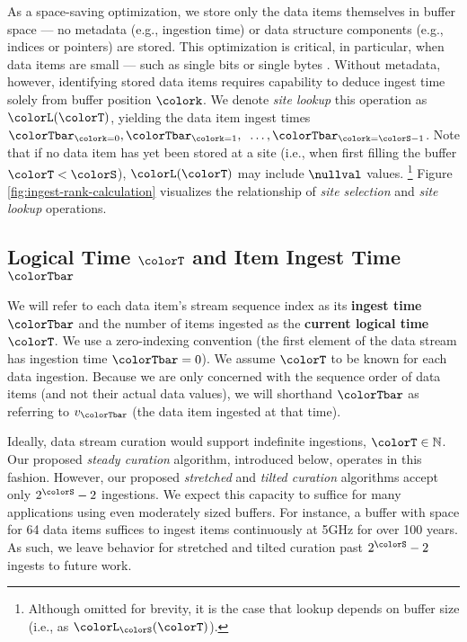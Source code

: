 As a space-saving optimization, we store only the data items themselves in buffer space --- no metadata (e.g., ingestion time) or data structure components (e.g., indices or pointers) are stored.
This optimization is critical, in particular, when data items are small --- such as single bits or single bytes \citep{moreno2022hereditary}.
Without metadata, however, identifying stored data items requires capability to deduce ingest time solely from buffer position $\colork$.
We denote \textit{site lookup} this operation as $\colorL(\colorT)$, yielding the data item ingest times $\colorTbar_{\colork=0}, \colorTbar_{\colork=1}, \;\;\ldots, \colorTbar_{\colork=\colorS-1}$.
Note that if no data item has yet been stored at a site (i.e., when first filling the buffer $\colorT < \colorS$), $\colorL(\colorT)$ may include $\nullval$ values.%
\footnote{%
Although omitted for brevity, it is the case that lookup depends on buffer size (i.e., as $\colorL_{\colorS}(\colorT)$).
}
Figure \ref{fig:ingest-rank-calculation} visualizes the relationship of \textit{site selection} and \textit{site lookup} operations.

\subsection{Logical Time $\colorT$ and Item Ingest Time $\colorTbar$}
\label{sec:notation-time}

We will refer to each data item's stream sequence index as its \textbf{ingest time} $\colorTbar$ and the number of items ingested as the \textbf{current logical time} $\colorT$.
We use a zero-indexing convention (the first element of the data stream has ingestion time $\colorTbar=0$).
We assume $\colorT$ to be known for each data ingestion.
Because we are only concerned with the sequence order of data items (and not their actual data values), we will shorthand $\colorTbar$ as referring to $v_{\colorTbar}$ (the data item ingested at that time).

Ideally, data stream curation would support indefinite ingestions, $\colorT \in \mathbb{N}$.
Our proposed \textit{steady curation} algorithm, introduced below, operates in this fashion.
However, our proposed \textit{stretched} and \textit{tilted curation} algorithms accept only $2^{\colorS} - 2$ ingestions.
We expect this capacity to suffice for many applications using even moderately sized buffers.
For instance, a buffer with space for 64 data items suffices to ingest items continuously at 5GHz for over 100 years.
As such, we leave behavior for stretched and tilted curation past $2^{\colorS} - 2$ ingests to future work.

